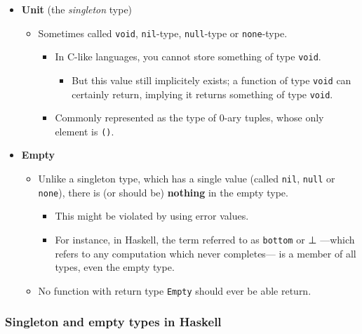 \documentclass[11pt]{article}
\theoremstyle{definition}
\begin{document}
\begin{itemize}
\item \textbf{Unit} (the \emph{singleton} type)
\begin{itemize}
\item Sometimes called \texttt{void}, \texttt{nil}-type, \texttt{null}-type or \texttt{none}-type.
\begin{itemize}
\item In C-like languages, you cannot store something of type \texttt{void}.
\begin{itemize}
\item But this value still implicitely exists;
a function of type \texttt{void} can certainly
return, implying it returns something of type \texttt{void}.
\end{itemize}
\item Commonly represented as the type of 0-ary tuples,
whose only element is \texttt{()}.
\end{itemize}
\end{itemize}
\item \textbf{Empty}
\begin{itemize}
\item Unlike a singleton type, which has a single value
(called \texttt{nil}, \texttt{null} or \texttt{none}), there is
(or should be) \textbf{nothing} in the empty type.
\begin{itemize}
\item This might be violated by using error values.
\item For instance, in Haskell, the term referred to as \texttt{bottom} or ⊥
—which refers to any computation which never completes—
 is a member of all types, even the empty type.
\end{itemize}
\item No function with return type \texttt{Empty} should
ever be able return.
\end{itemize}
\end{itemize}

\subsubsection{Singleton and empty types in Haskell}
\label{sec:org49c008a}
\end{document}
